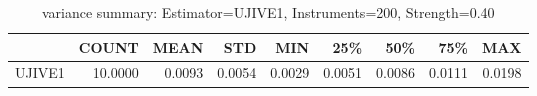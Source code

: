 \begin{table}[ht]
\centering
\caption{variance summary: Estimator=UJIVE1, Instruments=200, Strength=0.40}
\begin{tabular}{lrrrrrrrr}
\toprule
 & COUNT & MEAN & STD & MIN & 25\% & 50\% & 75\% & MAX \\
\midrule
UJIVE1 & 10.0000 & 0.0093 & 0.0054 & 0.0029 & 0.0051 & 0.0086 & 0.0111 & 0.0198 \\
\bottomrule
\end{tabular}
\end{table}
